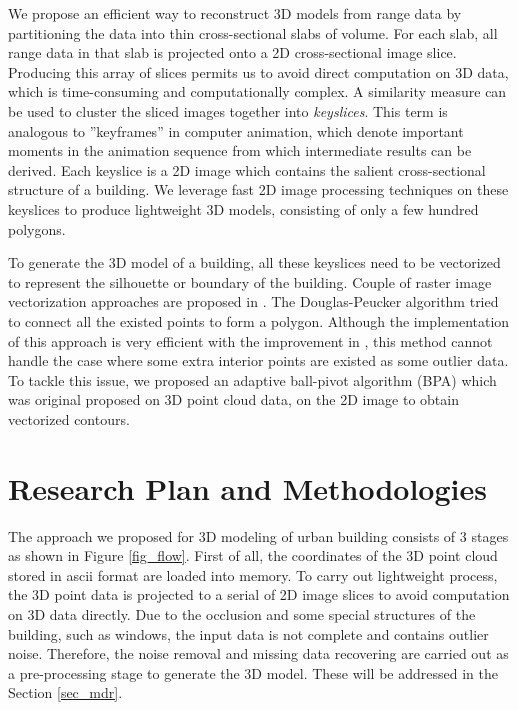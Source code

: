 \documentclass[12pt,letterpaper]{article}
\newcommand{\twocol}{0}
\renewcommand{\twocol}{true}
\begin{document}
We propose an efficient way to reconstruct 3D models from range data by
partitioning the data into thin cross-sectional slabs of volume.
For each slab, all range data in that slab is projected onto a 2D
cross-sectional image slice.
Producing this array of slices permits us to avoid direct computation on
3D data, which is time-consuming and computationally complex.
A similarity measure \cite{IR_Brown,IR_ZF,RE_WWLZ} can be used to cluster the sliced images
together into {\it keyslices}.
This term is analogous to ''keyframes'' in computer animation, which denote
important moments in the animation sequence from which intermediate results
can be derived.
Each keyslice is a 2D image which contains the salient cross-sectional
structure of a building.
We leverage fast 2D image processing techniques on these keyslices
to produce lightweight 3D models, consisting of only a few hundred polygons.

To generate the 3D model of a building, all these keyslices need to be vectorized to
represent the silhouette or boundary of the building. Couple of raster image vectorization approaches are
proposed in \cite{DP_AAKMT,DP_DP,DP_WM}. The Douglas-Peucker
algorithm tried to connect all the existed points to form a polygon. Although the implementation of
this approach is very efficient with the improvement in \cite{DP_HS},  this method cannot
handle the case where some extra interior points are existed as some outlier data.
To tackle this issue, we proposed an adaptive ball-pivot algorithm (BPA) which was
original proposed on 3D point cloud data, on the 2D image to obtain
vectorized contours.


\ifthenelse{\equal{\twocol}{true}}{
}{
\newpage %
}
\section{Research Plan and Methodologies}

The approach we proposed for 3D modeling of urban building consists of
3 stages as shown in Figure \ref{fig_flow}.
First of all, the coordinates of the 3D point cloud stored in ascii format are loaded into memory.
To carry out lightweight process, the 3D point data
is projected to a serial of 2D image slices to avoid computation on 3D data directly.
Due to the occlusion and some special structures of the building, such as windows, the input data
is not complete and contains outlier noise.
Therefore, the noise removal and missing data recovering are carried out as a pre-processing stage to
generate the 3D model.  These will be addressed in the Section \ref{sec_mdr}.
\end{document}
